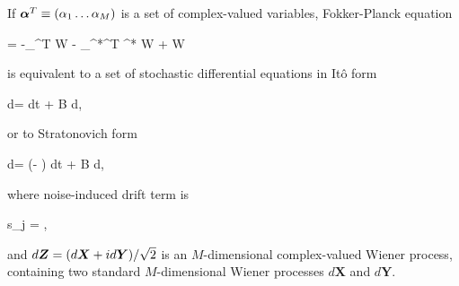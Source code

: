 \begin{theorem}
\label{thm:wigner-bec:fpe:fpe-sde-complex}
	If $\boldsymbol{\alpha}^T \equiv (\alpha_1 \ldots \alpha_M)$ is a set of complex-valued variables,
	Fokker-Planck equation
	\begin{eqn*}
		= -\bpartial_{\balpha}^T \avec W - \bpartial_{\balpha^*}^T \avec^* W
		+  W
	\end{eqn*}
	is equivalent to a set of stochastic differential equations in It\^{o} form
	\begin{eqn*}
		d\balpha = \avec dt + B d\Zvec,
	\end{eqn*}
	or to Stratonovich form
	\begin{eqn*}
		d\balpha = (\avec - \svec) dt + B d\Zvec,
	\end{eqn*}
	where noise-induced drift term is
	\begin{eqn*}
		s_j = \Trace{ B^H \bpartial_{\balpha^*} \evec_j^T B },
	\end{eqn*}
	and $d\boldsymbol{Z} = (d\bm{X} + id\bm{Y}) / \sqrt{2}$ is an $M$-dimensional complex-valued Wiener process,
	containing two standard $M$-dimensional Wiener processes $d\bm{X}$ and $d\bm{Y}$.
\end{theorem}
